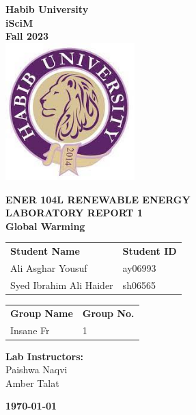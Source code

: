 \documentclass[a4paper, 12pt, english]{article}
\begin{document}
\begin{titlepage}
	\begin{center}
		\textbf{\LARGE Habib University}\\[0.5cm]
		\textbf{\large iSciM}\\[0.2cm]
		\textbf {\large Fall 2023}\\[0.2cm]
		\vspace{20pt}
		\includegraphics[width=5cm]{../habiblogo.jpg}\\[1cm]
		\par
		\vspace{20pt}
		\textbf{\Large ENER 104L RENEWABLE ENERGY}\\
		\vspace{15pt}
		\myrule[1pt][7pt]
		\textbf{\LARGE  LABORATORY REPORT 1}\\
		\vspace{15pt}
		\textbf{\large Global Warming}\\
		\myrule[1pt][7pt]
		\vspace{25pt}
		\begin{tabular}{@{}p{5cm}p{3cm}@{}}
			\textbf{\large Student Name} & \textbf{\large Student ID} \\
			Ali Asghar Yousuf            & ay06993                    \\ %
			Syed Ibrahim Ali Haider      & sh06565                    \\ %
		\end{tabular}

		\vspace{10pt}
		\begin{tabular}{@{}p{5cm}p{3cm}@{}}
			\textbf{\large Group Name} & \textbf{\large Group No.} \\
			Insane Fr                  & 1                         \\
		\end{tabular}

		\vspace{45pt}
		\textbf {\large Lab Instructors:}\\[0.2cm]
		\Large {Paishwa Naqvi}\\[0.1cm]
		\Large {Amber Talat}\\[0.1cm]
	\end{center}

	\par
	\vfill
	\begin{center}
		\textbf{\today}\\
	\end{center}

\end{titlepage}
\end{document}
